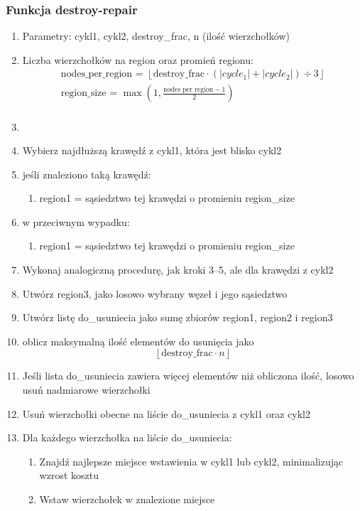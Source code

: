 \documentclass[11pt]{article}
\begin{document}
\subsubsection{Funkcja destroy-repair}
\begin{enumerate}
    \item Parametry: cykl1, cykl2, destroy\_frac, n (ilość wierzchołków)
    \item Liczba wierzchołków na region oraz promień regionu:
    \begin{gather*}
        \text{nodes\_per\_region = }  \left\lfloor \text{destroy\_frac} \cdot (|cycle_1| + |cycle_2|) \div 3 \right\rfloor\\
        \text{region\_size = } \max\left(1, \frac{\text{nodes per region} - 1}{2} \right)\\
    \end{gather*}

    \item

    \item  Wybierz najdłuższą krawędź z cykl1, która jest blisko cykl2
    \item jeśli znaleziono taką krawędź:
    \begin{enumerate}
        \item region1 = sąsiedztwo tej krawędzi o promieniu region\_size
    \end{enumerate}
    \item w przeciwnym wypadku:
    \begin{enumerate}
        \item region1 = sąsiedztwo tej krawędzi o promieniu region\_size
    \end{enumerate}
    \item Wykonaj analogiczną procedurę, jak kroki 3--5, ale dla krawędzi z cykl2
    \item Utwórz region3, jako losowo wybrany węzeł i jego sąsiedztwo
    \item Utwórz listę do\_usuniecia jako sumę zbiorów region1, region2 i region3
    \item oblicz maksymalną ilość elementów do usunięcia jako $$\left\lfloor \text{destroy\_frac} \cdot n\right\rfloor$$
    \item Jeśli lista do\_usuniecia zawiera więcej elementów niż obliczona ilość, losowo usuń nadmiarowe wierzchołki
    \item Usuń wierzchołki obecne na liście do\_usuniecia z cykl1 oraz cykl2
    \item Dla każdego wierzchołka na liście do\_usuniecia:
    \begin{enumerate}
        \item Znajdź najlepsze miejsce wstawienia w cykl1 lub cykl2, minimalizując wzrost kosztu
        \item Wstaw wierzchołek w znalezione miejsce
    \end{enumerate}

\end{enumerate}
\end{document}
